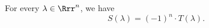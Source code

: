 \begin{theorem}
For every $\lambda \in \Rrr^{n}$, we have
\[S(\lambda)=(-1)^{n} \cdot T(\lambda) . \]
\label{theorem_S_equal_T}
\end{theorem}
